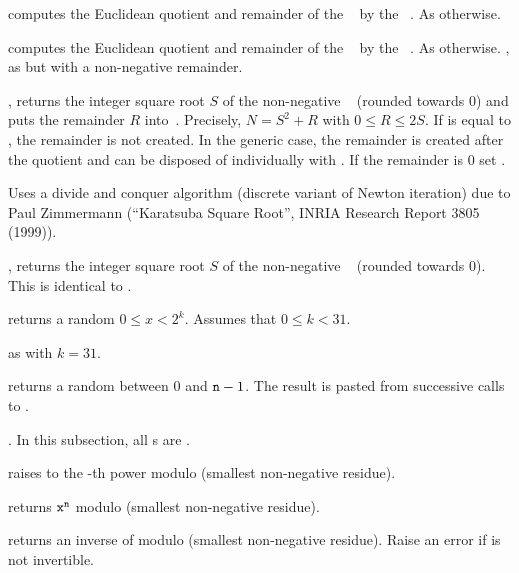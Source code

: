  computes the Euclidean quotient
and remainder of the ~ by the ~. As
 otherwise.

 computes the Euclidean quotient
and remainder of the ~ by the ~. As
 otherwise.
\smallskip
{}, as  but with a
non-negative remainder.


, returns the integer square root $S$ of
the non-negative ~ (rounded towards 0) and puts the remainder
$R$ into~. Precisely, $N = S^2 + R$ with $0\leq R \leq 2S$. If
 is equal to , the remainder is not created. In the generic
case, the remainder is created after the quotient and can be disposed of
individually with . If the remainder is $0$ set .

Uses a divide and conquer algorithm (discrete variant of Newton iteration)
due to Paul Zimmermann (``Karatsuba Square Root'', INRIA Research Report 3805
(1999)).

, returns the integer square root $S$ of
the non-negative ~ (rounded towards 0). This is identical
to .


 returns a random $0 \leq x < 2^k$. Assumes
that $0 \leq k < 31$.

 as  with $k = 31$.

 returns a random  between $0$ and ${\tt n}
- 1$. The result is pasted from successive calls to .

. In this subsection, all s are .

 raises  to the -th
power modulo  (smallest non-negative residue).

 returns ${\tt x}^{\tt n}$
modulo  (smallest non-negative residue).

 returns an inverse of  modulo 
(smallest non-negative residue). Raise an error if  is not invertible.


